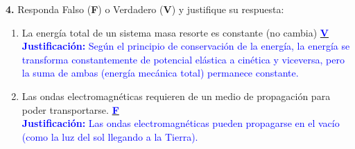 \documentclass[11pt, letterpaper]{article}
\begin{document}
	\vspace{1.5cm}
	\noindent \textbf{4.} Responda Falso (\textbf{F}) o Verdadero (\textbf{V}) y justifique su respuesta:
	\begin{enumerate}[label=\alph*), itemsep=0.4cm, leftmargin=0.8cm]
		\item  La energía total de un sistema masa resorte es constante (no cambia) \underline{\hspace{0.5cm}\textcolor{blue}{\textbf{ V }}\hspace{0.5cm}} \\
		\textcolor{blue}{\textbf{Justificación:} Según el principio de conservación de la energía, la energía se transforma constantemente de potencial elástica a cinética y viceversa, pero la suma de ambas (energía mecánica total) permanece constante.}
		
		\item Las ondas electromagnéticas requieren de un medio de propagación para poder transportarse. \underline{\hspace{0.5cm}\textcolor{blue}{\textbf{ F }}\hspace{0.5cm}} \\
		\textcolor{blue}{\textbf{Justificación:} Las ondas electromagnéticas pueden propagarse en el vacío (como la luz del sol llegando a la Tierra).}
	\end{enumerate}
	
\end{document}
